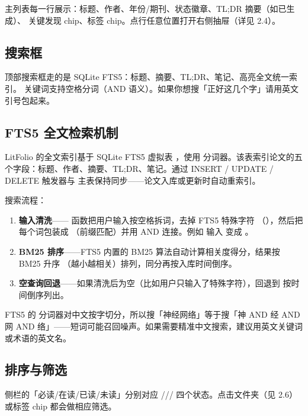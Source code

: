 主列表每一行展示：标题、作者、年份/期刊、状态徽章、TL;DR 摘要（如已生成）、
关键发现 chip、标签 chip。点行任意位置打开右侧抽屉（详见 2.4）。

\subsection{搜索框}

顶部搜索框走的是 SQLite FTS5：标题、摘要、TL;DR、笔记、高亮全文统一索引。
关键词支持空格分词（AND 语义）。如果你想搜「正好这几个字」请用英文引号包起来。

\subsection{FTS5 全文检索机制}

LitFolio 的全文索引基于 SQLite FTS5 虚拟表 ，使用 
分词器。该表索引论文的五个字段：标题、作者、摘要、TL;DR、笔记。通过 INSERT / UPDATE /
DELETE 触发器与  主表保持同步——论文入库或更新时自动重索引。

搜索流程：

\begin{enumerate}
  \item \textbf{输入清洗}—— 函数把用户输入按空格拆词，去掉 FTS5 特殊字符
    （），然后把每个词包装成 （前缀匹配）并用 AND 连接。例如
    输入  变成 。
  \item \textbf{BM25 排序}——FTS5 内置的 BM25 算法自动计算相关度得分，结果按 BM25 升序
    （越小越相关）排列，同分再按入库时间倒序。
  \item \textbf{空查询回退}——如果清洗后为空（比如用户只输入了特殊字符），回退到
     按时间倒序列出。
\end{enumerate}

\begin{tipbox}
FTS5 的  分词器对中文按字切分，所以搜「神经网络」等于搜「神 AND 经 AND
网 AND 络」——短词可能召回噪声。如果需要精准中文搜索，建议用英文关键词或术语的英文名。
\end{tipbox}

\subsection{排序与筛选}

侧栏的「必读/在读/已读/未读」分别对应 ///
四个状态。点击文件夹（见 2.6）或标签 chip 都会做相应筛选。

